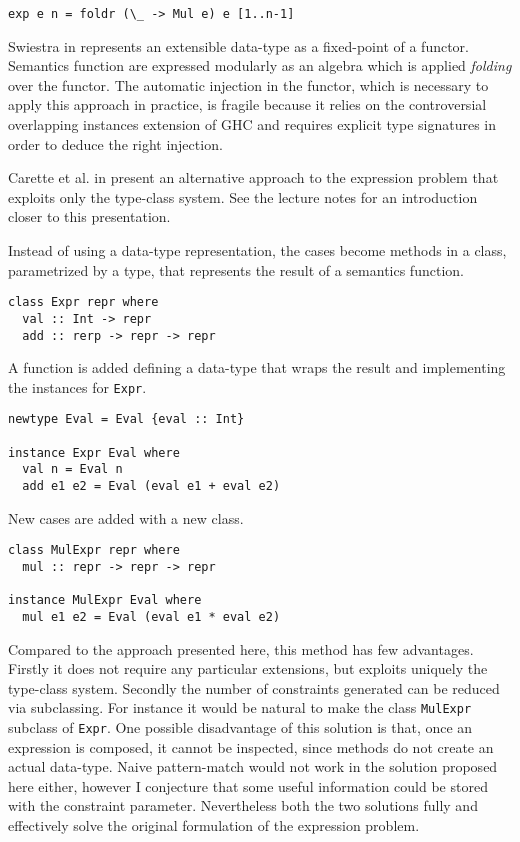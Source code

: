 \documentclass[../Thesis.tex]{subfiles}
\begin{document}
\begin{verbatim}
exp e n = foldr (\_ -> Mul e) e [1..n-1]
\end{verbatim}

Swiestra in \cite{Swierstra08DTL} represents an extensible data-type as a fixed-point of a functor. Semantics function are expressed modularly as an algebra which is applied \emph{folding} over the functor.
The automatic injection in the functor, which is necessary to apply this approach in practice, is fragile because it relies on the controversial overlapping instances extension of GHC and requires explicit type signatures in order to deduce the right injection.

Carette et al. in \cite{Carette09FTP} present an alternative approach to the expression problem that exploits only the type-class system. See the lecture notes \cite{Oleg12FTP} for an introduction closer to this presentation.

Instead of using a data-type representation, the cases become methods in a class, parametrized by a type, that represents the result of a semantics function.

\begin{verbatim}
class Expr repr where
  val :: Int -> repr
  add :: rerp -> repr -> repr
\end{verbatim}

A function is added defining a data-type that wraps the result and implementing the instances for \texttt{Expr}.

\begin{verbatim}
newtype Eval = Eval {eval :: Int}

instance Expr Eval where
  val n = Eval n
  add e1 e2 = Eval (eval e1 + eval e2)
\end{verbatim}

New cases are added with a new class.

\begin{verbatim}
class MulExpr repr where
  mul :: repr -> repr -> repr

instance MulExpr Eval where
  mul e1 e2 = Eval (eval e1 * eval e2)
\end{verbatim}

Compared to the approach presented here, this method has few advantages.
Firstly it does not require any particular extensions, but exploits uniquely 
the type-class system. Secondly the number of constraints generated can be
reduced via subclassing. For instance it would be natural to make the class
\texttt{MulExpr} subclass of \texttt{Expr}.
One possible disadvantage of this solution is that, once an expression is composed, it cannot be inspected, since methods do not create an actual data-type. Naive pattern-match would not work in the solution proposed here either, however I conjecture that some useful information could be stored with
the constraint parameter. 
Nevertheless both the two solutions fully and effectively solve the original formulation of the expression problem.
\end{document}
